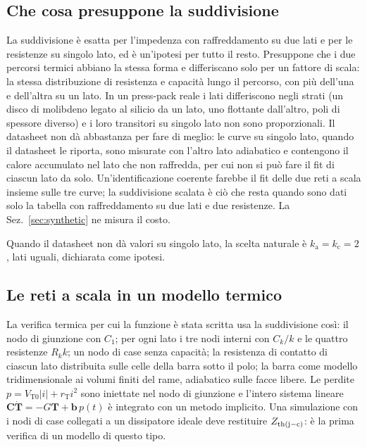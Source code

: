 \documentclass[10pt,a4paper]{scrartcl}
\let\newcommand\fcitdefine
\newcommand{\Zjc}{Z_\mathrm{th(j-c)}}
\begin{document}
\subsection{Che cosa presuppone la suddivisione}
La suddivisione è esatta per l'impedenza con raffreddamento su due lati e per le resistenze su singolo lato, ed è un'ipotesi per tutto il resto. Presuppone che i due percorsi termici abbiano la stessa forma e differiscano solo per un fattore di scala: la stessa distribuzione di resistenza e capacità lungo il percorso, con più dell'una e dell'altra su un lato. In un press-pack reale i lati differiscono negli strati (un disco di molibdeno legato al silicio da un lato, uno flottante dall'altro, poli di spessore diverso) e i loro transitori su singolo lato non sono proporzionali. Il datasheet non dà abbastanza per fare di meglio: le curve su singolo lato, quando il datasheet le riporta, sono misurate con l'altro lato adiabatico e contengono il calore accumulato nel lato che non raffredda, per cui non si può fare il fit di ciascun lato da solo. Un'identificazione coerente farebbe il fit delle due reti a scala insieme sulle tre curve; la suddivisione scalata è ciò che resta quando sono dati solo la tabella con raffreddamento su due lati e due resistenze. La Sez.~\ref{sec:synthetic} ne misura il costo.

Quando il datasheet non dà valori su singolo lato, la scelta naturale è $k_\mathrm{a} = k_\mathrm{c} = 2$, lati uguali, dichiarata come ipotesi.

\subsection{Le reti a scala in un modello termico}
La verifica termica per cui la funzione è stata scritta usa la suddivisione così: il nodo di giunzione con $C_1$; per ogni lato i tre nodi interni con $C_k/k$ e le quattro resistenze $R_kk$; un nodo di case senza capacità; la resistenza di contatto di ciascun lato distribuita sulle celle della barra sotto il polo; la barra come modello tridimensionale ai volumi finiti del rame, adiabatico sulle facce libere. Le perdite $p = V_\mathrm{T0}|i| + r_\mathrm{T}i^2$ sono iniettate nel nodo di giunzione e l'intero sistema lineare $\mathbf{C}\dot{\mathbf{T}} = -G\mathbf{T} + \mathbf{b}\,p(t)$ è integrato con un metodo implicito. Una simulazione con i nodi di case collegati a un dissipatore ideale deve restituire $\Zjc$: è la prima verifica di un modello di questo tipo.

\end{document}
